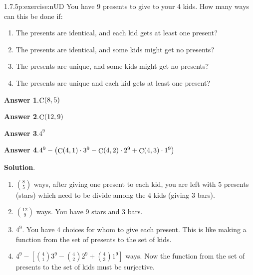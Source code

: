 \documentclass[twoside,11pt,]{book}
\newcommand{\blocktitlefont}{\relax}
\numberwithin{equation}{chapter}
\begin{document}
\begin{divisionsolution}{1.7.5}{}{p:exercise:nUD}%
You have 9 presents to give to your 4 kids. How many ways can this be done if:%
\begin{enumerate}[label=(\alph*)]
\item{}The presents are identical, and each kid gets at least one present?%
\item{}The presents are identical, and some kids might get no presents?%
\item{}The presents are unique, and some kids might get no presents?%
\item{}The presents are unique and each kid gets at least one present?%
\end{enumerate}
%
\par\smallskip%
\noindent\textbf{\blocktitlefont Answer 1}.\quad{}\(\mathop{\rm C}\nolimits\!\left(8,5\right)\)%
\par\smallskip%
\noindent\textbf{\blocktitlefont Answer 2}.\quad{}\(\mathop{\rm C}\nolimits\!\left(12,9\right)\)%
\par\smallskip%
\noindent\textbf{\blocktitlefont Answer 3}.\quad{}\(4^{9}\)%
\par\smallskip%
\noindent\textbf{\blocktitlefont Answer 4}.\quad{}\(4^{9}-\left(\mathop{\rm C}\nolimits\!\left(4,1\right)\cdot 3^{9}-\mathop{\rm C}\nolimits\!\left(4,2\right)\cdot 2^{9}+\mathop{\rm C}\nolimits\!\left(4,3\right)\cdot 1^{9}\right)\)%
\par\smallskip%
\noindent\textbf{\blocktitlefont Solution}.\quad{}%
\begin{enumerate}[label=(\alph*)]
\item{}\({8 \choose 5}\) ways, after giving one present to each kid, you are left with 5 presents (stars) which need to be divide among the 4 kids (giving 3 bars).%
\item{}\({12 \choose 9}\) ways. You have 9 stars and 3 bars.%
\item{}\(4^9\text{.}\) You have 4 choices for whom to give each present. This is like making a function from the set of presents to the set of kids.%
\item{}\(4^9 - \left[{4 \choose 1}3^9 - {4\choose 2}2^9 + {4 \choose 3}1^9 \right]\) ways. Now the function from the set of presents to the set of kids must be surjective.%
\end{enumerate}
%
\end{divisionsolution}%
\end{document}
